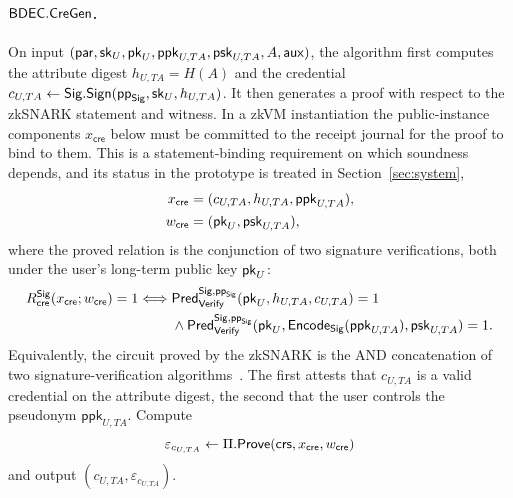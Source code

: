 \begin{construction}
\paragraph{$\mathsf{BDEC}.\mathsf{CreGen}$.}
On input $(\mathsf{par},\mathsf{sk}_U,\mathsf{pk}_U,\mathsf{ppk}_{U,TA},\mathsf{psk}_{U,TA},A,\mathsf{aux})$, the algorithm first computes the attribute digest $h_{U,TA}=H(A)$ and the credential $c_{U,TA}\leftarrow\mathsf{Sig}.\mathsf{Sign}(\mathsf{pp}_{\mathsf{Sig}},\mathsf{sk}_U,h_{U,TA})$. It then generates a proof with respect to the zkSNARK statement and witness. In a zkVM instantiation the public-instance components $x_{\mathsf{cre}}$ below must be committed to the receipt journal for the proof to bind to them. This is a statement-binding requirement on which soundness depends, and its status in the prototype is treated in Section~\ref{sec:system},
\begin{equation*}
\begin{aligned}
  x_{\mathsf{cre}} &=(c_{U,TA},h_{U,TA},\mathsf{ppk}_{U,TA}),\\
  w_{\mathsf{cre}} &=(\mathsf{pk}_U,\mathsf{psk}_{U,TA}),
\end{aligned}
\end{equation*}
where the proved relation is the conjunction of two signature verifications, both under the user's long-term public key $\mathsf{pk}_U$:
\begin{equation*}
\begin{aligned}
R_{\mathsf{cre}}^{\mathsf{Sig}}(x_{\mathsf{cre}};w_{\mathsf{cre}})=1
\Longleftrightarrow{}&
\mathsf{Pred}_{\mathsf{Verify}}^{\mathsf{Sig},\mathsf{pp}_{\mathsf{Sig}}}(\mathsf{pk}_U,h_{U,TA},c_{U,TA})=1\\
&\land
\mathsf{Pred}_{\mathsf{Verify}}^{\mathsf{Sig},\mathsf{pp}_{\mathsf{Sig}}}(\mathsf{pk}_U,\mathsf{Encode}_{\mathsf{Sig}}(\mathsf{ppk}_{U,TA}),\mathsf{psk}_{U,TA})=1.
\end{aligned}
\end{equation*}
Equivalently, the circuit proved by the zkSNARK is the AND concatenation of two signature-verification algorithms~\cite{10.1007/978-981-96-0957-4_3}. The first attests that $c_{U,TA}$ is a valid credential on the attribute digest, the second that the user controls the pseudonym $\mathsf{ppk}_{U,TA}$. Compute
\begin{equation*}
  \varepsilon_{c_{U,TA}}\leftarrow\Pi.\mathsf{Prove}(\mathsf{crs},x_{\mathsf{cre}},w_{\mathsf{cre}})
\end{equation*}
and output $(c_{U,TA},\varepsilon_{c_{U,TA}})$.


\end{construction}
